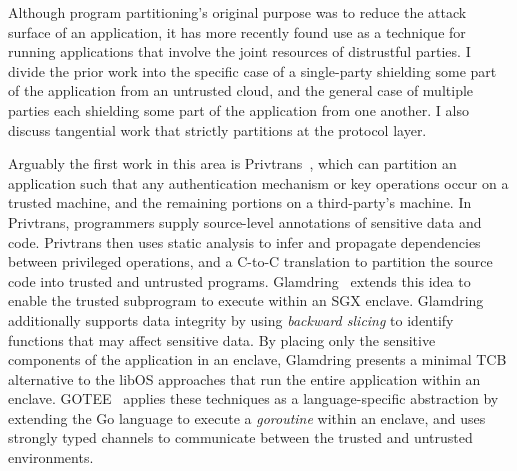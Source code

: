 Although program partitioning's original purpose was to reduce the attack
surface of an application, it has more recently found use as a technique for
running applications that involve the joint resources of distrustful parties.
%
I divide the prior work into the specific case of a single-party shielding
some part of the application from an untrusted cloud, and the general case of
multiple parties each shielding some part of the application from one another.
%
I also discuss tangential work that strictly partitions at the protocol layer.


%
Arguably the first work in this area is Privtrans~\cite{privtrans}, which
can partition an application such that any authentication mechanism or key
operations occur on a trusted machine, and the remaining portions on a
third-party's machine.
%
In Privtrans, programmers supply source-level annotations of sensitive data and
code.
%
Privtrans then uses static analysis to infer and propagate dependencies between
privileged operations, and a C-to-C translation to partition the source code
into trusted and untrusted programs.
%
Glamdring~\cite{glamdring} extends this idea to enable the trusted
subprogram to execute within an SGX enclave.
%
Glamdring additionally supports data integrity by using \emph{backward
slicing} to identify functions that may affect sensitive data.
%
By placing only the sensitive components of the application in an enclave,
Glamdring presents a minimal TCB alternative to the libOS approaches that
run the entire application within an enclave.
%
GOTEE~\cite{secured-routines} applies these techniques as  a language-specific
abstraction by extending the Go language to execute a \emph{goroutine} within
an enclave, and uses strongly typed channels to communicate between the trusted
and untrusted environments.




